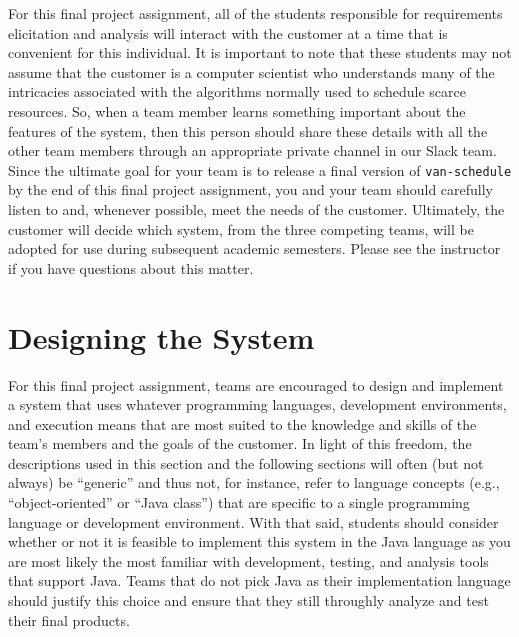 For this final project assignment, all of the students responsible for requirements elicitation and analysis will
interact with the customer at a time that is convenient for this individual. It is important to note that these students
may not assume that the customer is a computer scientist who understands many of the intricacies associated with the
algorithms normally used to schedule scarce resources. So, when a team member learns something important about the
features of the system, then this person should share these details with all the other team members through an
appropriate private channel in our Slack team.  Since the ultimate goal for your team is to release a final version of
{\tt van-schedule} by the end of this final project assignment, you and your team should carefully listen to and,
whenever possible, meet the needs of the customer. Ultimately, the customer will decide which system, from the three
competing teams, will be adopted for use during subsequent academic semesters. Please see the instructor if you have
questions about this matter.

\vspace*{-.1in}
\section*{Designing the System}

For this final project assignment, teams are encouraged to design and implement a system that uses whatever programming
languages, development environments, and execution means that are most suited to the knowledge and skills of the team's
members and the goals of the customer.  In light of this freedom, the descriptions used in this section and the
following sections will often (but not always) be ``generic'' and thus not, for instance, refer to language concepts
(e.g., ``object-oriented'' or ``Java class'') that are specific to a single programming language or development
environment.  With that said, students should consider whether or not it is feasible to implement this system in the
Java language as you are most likely the most familiar with development, testing, and analysis tools that support Java.
Teams that do not pick Java as their implementation language should justify this choice and ensure that they still
throughly analyze and test their final products.


